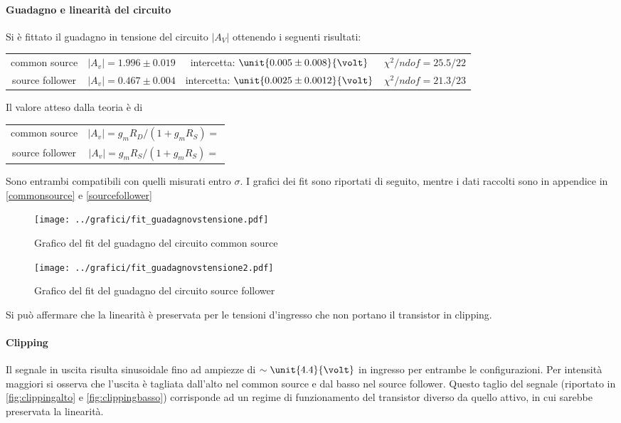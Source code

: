 \documentclass[10pt,a4paper]{article}
\begin{document}
\paragraph{Guadagno e linearità del circuito} Si è fittato il guadagno in tensione del circuito $|A_V|$ ottenendo i seguenti risultati:
\begin{table}[h!]
	\centering
	\begin{tabular}{cccc}
		common source & $|A_v| = 1.996 \pm 0.019$ & intercetta: $\unit{0.005 \pm 0.008}{\volt}$ & $\chi^2 / ndof = 25.5 / 22$\\
		source follower &	$|A_v| = 0.467 \pm 0.004$ & intercetta: $\unit{0.0025 \pm 0.0012}{\volt}$ & $\chi^2 / ndof = 21.3 / 23$
	\end{tabular}
\end{table}

Il valore atteso dalla teoria è di

\begin{table}[h!]
	\centering
	\begin{tabular}{cc}
		common source & $|A_v| =g_mR_D/(1+g_mR_S) =$ \\
		source follower &	$|A_v| =g_mR_S/(1+g_mR_S) = $
	\end{tabular}
\end{table}

Sono entrambi compatibili con quelli misurati entro $\sigma$.
I grafici dei fit sono riportati di seguito, mentre i dati raccolti sono in appendice in \tablename{\ref{commonsource}} e \tablename{\ref{sourcefollower}}

\begin{figure}[h!]
	\centering
	\texttt{[image: ../grafici/fit\_guadagnovstensione.pdf]}
	\caption{Grafico del fit del guadagno del circuito common source}
\end{figure}
\begin{figure}[h!]
	\centering
	\texttt{[image: ../grafici/fit\_guadagnovstensione2.pdf]}
	\caption{Grafico del fit del guadagno del circuito source follower}
\end{figure}

 Si può affermare che la linearità è preservata per le tensioni d'ingresso che non portano il transistor in clipping.
  
 \paragraph{Clipping}
Il segnale in uscita risulta sinusoidale fino ad ampiezze di $\sim \unit{4.4}{\volt}$ in ingresso per entrambe le configurazioni.
Per intensità maggiori si osserva che l'uscita è tagliata dall'alto nel common source e dal basso nel source follower. Questo taglio del segnale (riportato in \figurename{\ref{fig:clippingalto}} e \figurename{\ref{fig:clippingbasso}}) corrisponde ad un regime di funzionamento del transistor diverso da quello attivo, in cui sarebbe preservata la linearità.
\end{document}
